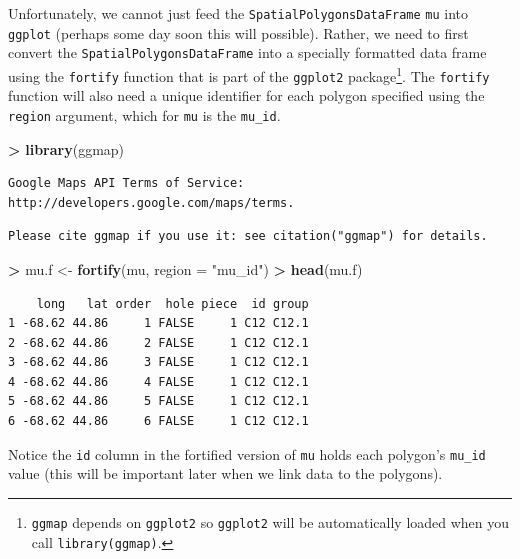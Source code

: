 \documentclass[]{krantz}
\makeatletter
\newenvironment{Shaded}{\begin{snugshade}}{\end{snugshade}}
\newcommand{\KeywordTok}[1]{\textcolor[rgb]{0.27,0.27,0.27}{\textbf{#1}}}
\newcommand{\DataTypeTok}[1]{\textcolor[rgb]{0.27,0.27,0.27}{#1}}
\newcommand{\StringTok}[1]{\textcolor[rgb]{0.5,0.5,0.5}{#1}}
\newcommand{\OperatorTok}[1]{\textcolor[rgb]{0.43,0.43,0.43}{\textbf{#1}}}
\newcommand{\NormalTok}[1]{#1}
\newenvironment{kframe}{%
\medskip{}
\setlength{\fboxsep}{.8em}
 \def\at@end@of@kframe{}%
 \ifinner\ifhmode%
  \def\at@end@of@kframe{\end{minipage}}%
  \begin{minipage}{\columnwidth}%
 \fi\fi%
 \def\FrameCommand##1{\hskip\@totalleftmargin \hskip-\fboxsep
 \colorbox{shadecolor}{##1}\hskip-\fboxsep
     \hskip-\linewidth \hskip-\@totalleftmargin \hskip\columnwidth}%
 \MakeFramed {\advance\hsize-\width
   \@totalleftmargin\z@ \linewidth\hsize
   \@setminipage}}%
 {\par\unskip\endMakeFramed%
 \at@end@of@kframe}
\renewenvironment{Shaded}{\begin{kframe}}{\end{kframe}}
\theoremstyle{definition}
\theoremstyle{definition}
\theoremstyle{definition}
\theoremstyle{remark}
\makeatother
\begin{document}
Unfortunately, we cannot just feed the \texttt{SpatialPolygonsDataFrame}
\texttt{mu} into \texttt{ggplot} (perhaps some day soon this will
possible). Rather, we need to first convert the
\texttt{SpatialPolygonsDataFrame} into a specially formatted data frame
using the \texttt{fortify} function that is part of the \texttt{ggplot2}
package\footnote{\texttt{ggmap} depends on \texttt{ggplot2} so
  \texttt{ggplot2} will be automatically loaded when you call
  \texttt{library(ggmap)}.}. The \texttt{fortify} function will also
need a unique identifier for each polygon specified using the
\texttt{region} argument, which for \texttt{mu} is the \texttt{mu\_id}.

\begin{Shaded}
\begin{Highlighting}[]
\OperatorTok{>}\StringTok{ }\KeywordTok{library}\NormalTok{(ggmap)}
\end{Highlighting}
\end{Shaded}

\begin{verbatim}
Google Maps API Terms of Service: http://developers.google.com/maps/terms.
\end{verbatim}

\begin{verbatim}
Please cite ggmap if you use it: see citation("ggmap") for details.
\end{verbatim}

\begin{Shaded}
\begin{Highlighting}[]
\OperatorTok{>}\StringTok{ }\NormalTok{mu.f <-}\StringTok{ }\KeywordTok{fortify}\NormalTok{(mu, }\DataTypeTok{region =} \StringTok{"mu_id"}\NormalTok{)}
\OperatorTok{>}\StringTok{ }\KeywordTok{head}\NormalTok{(mu.f)}
\end{Highlighting}
\end{Shaded}

\begin{verbatim}
    long   lat order  hole piece  id group
1 -68.62 44.86     1 FALSE     1 C12 C12.1
2 -68.62 44.86     2 FALSE     1 C12 C12.1
3 -68.62 44.86     3 FALSE     1 C12 C12.1
4 -68.62 44.86     4 FALSE     1 C12 C12.1
5 -68.62 44.86     5 FALSE     1 C12 C12.1
6 -68.62 44.86     6 FALSE     1 C12 C12.1
\end{verbatim}

Notice the \texttt{id} column in the fortified version of \texttt{mu}
holds each polygon's \texttt{mu\_id} value (this will be important later
when we link data to the polygons).
\end{document}
